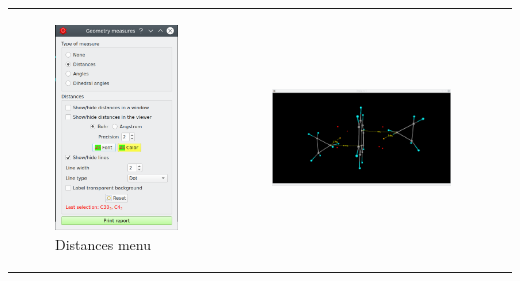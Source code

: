 \documentclass[10pt]{article}
\begin{document}
\hspace*{0mm}
\begin{tabular}{lcr}
\begin{minipage}{.2\linewidth}
\begin{figure}[H]
    \begin{center}
        \includegraphics[width=.7\linewidth]{damqt320_distances_1.png}
    \end{center}
    \vspace*{-1mm}
    \caption{Distances menu \label{fig:4_2_2}}
\end{figure}
\end{minipage}
&
\begin{minipage}{.45\linewidth}
    \vspace*{-5mm}
    \begin{figure}[H]
        \begin{center}
            \hspace*{-5mm}
            \includegraphics[width=1\linewidth]{damqt320_distances_2.png}

\end{center}
\end{figure}
\end{minipage}
\end{tabular}
\end{document}
